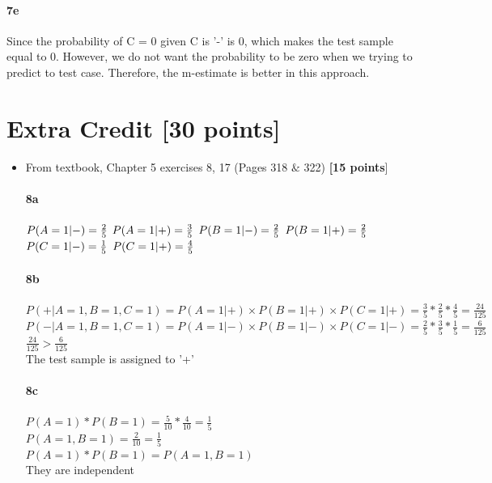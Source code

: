 \documentclass{article}
\begin{document}
\paragraph{7e}
Since the probability of C = 0 given C is '-' is 0, which makes the test sample equal to 0. However, we do not want the probability to be zero when we trying to predict to test case. Therefore, the m-estimate is better in this approach.
  \section*{Extra Credit [30 points]} 
\begin{itemize}
\item From textbook, Chapter 5 exercises 8, 17 (Pages 318 $\&$ 322) \textbf{[15 points}]
\paragraph{8a}
$P(A = 1|-)=\frac{2}{5}\\$
$P(A = 1|+) = \frac{3}{5}\\$
$P(B = 1|-)=\frac{2}{5}\\$
$P(B = 1|+) = \frac{2}{5}\\$
$P(C = 1|-)=\frac{1}{5}\\$
$P(C = 1|+) = \frac{4}{5}\\$
\paragraph{8b}
$P(+|A = 1, B = 1, C = 1) = P(A = 1|+) × P(B = 1|+) × P(C = 1|+) = \frac{3}{5} * \frac{2}{5} * \frac{4}{5} = \frac{24}{125}$\\
$P(-|A = 1,B = 1, C = 1) = P(A = 1|-) × P(B = 1|-) × P(C = 1|-)= \frac{2}{5} * \frac{3}{5} * \frac{1}{5} = \frac{6}{125}$\\
$\frac{24}{125} > \frac{6}{125}$\\
The test sample is assigned to '+'\\
\paragraph{8c}
$P(A = 1) * P(B = 1) = \frac{5}{10}* \frac{4}{10} = \frac{1}{5}$\\
$P(A = 1, B = 1) = \frac{2}{10} = \frac{1}{5}$\\
$P(A = 1) * P(B = 1) = P(A = 1, B = 1)$\\
They are independent

\end{itemize}
\end{document}
